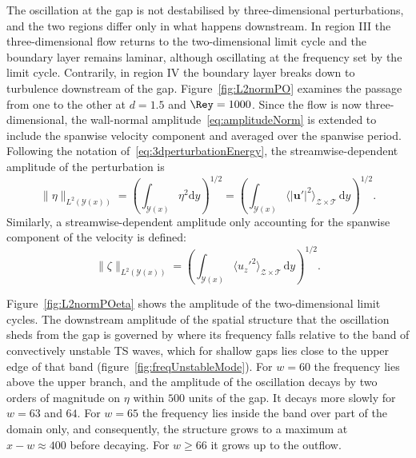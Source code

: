 \documentclass[lineno]{jfm}
\begin{document}
The oscillation at the gap is not destabilised by three-dimensional perturbations, and the two regions differ only in what happens downstream. In region III the three-dimensional flow returns to the two-dimensional limit cycle and the boundary layer remains laminar, although oscillating at the frequency set by the limit cycle. Contrarily, in region IV the boundary layer breaks down to turbulence downstream of the gap. Figure~\ref{fig:L2normPO} examines the passage from one to the other at $d=1.5$ and $\Rey=1000$. Since the flow is now three-dimensional, the wall-normal amplitude~\eqref{eq:amplitudeNorm} is extended to include the spanwise velocity component and averaged over the spanwise period. Following the notation of~\eqref{eq:3dperturbationEnergy}, the streamwise-dependent amplitude of the perturbation is
\begin{equation}\label{eq:amplitudeNorm3D}
	\|\eta\|_{L^2(\mathcal{Y}(x))} = {\left( \int_{\mathcal{Y}(x)} {\eta^2} \mathrm{d}y \right)}^{1/2} = {\left( \int_{\mathcal{Y}(x)} {\langle |\boldsymbol{u}'|^2\rangle}_{\mathcal{Z}\times\mathcal{T}}\, \mathrm{d}y \right)}^{1/2}.
\end{equation}
Similarly, a streamwise-dependent amplitude only accounting for the spanwise component of the velocity is defined:
\begin{equation}
	\|\zeta\|_{L^2(\mathcal{Y}(x))}= {\left( \int_{\mathcal{Y}(x)} {\langle {u_z'}^2\rangle}_{\mathcal{Z}\times\mathcal{T}}\, \mathrm{d}y \right)}^{1/2}.
\end{equation}

Figure~\ref{fig:L2normPOeta} shows the amplitude of the two-dimensional limit cycles. The downstream amplitude of the spatial structure that the oscillation sheds from the gap is governed by where its frequency falls relative to the band of convectively unstable \ac{TS} waves, which for shallow gaps lies close to the upper edge of that band (figure~\ref{fig:freqUnstableMode}). For $w=60$ the frequency lies above the upper branch, and the amplitude of the oscillation decays by two orders of magnitude on $\eta$ within $500$ units of the gap. It decays more slowly for $w=63$ and $64$. For $w=65$ the frequency lies inside the band over part of the domain only, and consequently, the structure grows to a maximum at $x-w\approx400$ before decaying. For $w\geq66$ it grows up to the outflow.
\end{document}
